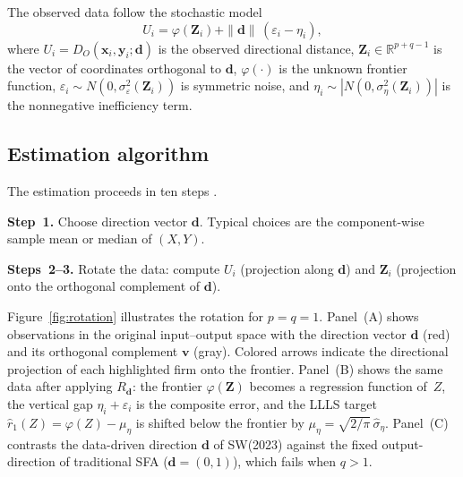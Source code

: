 \documentclass[article]{jss}
\begin{document}
The observed data follow the stochastic model
%
\begin{equation}
  U_i = \varphi(\mathbf{Z}_i) + \|\mathbf{d}\|\,(\varepsilon_i - \eta_i),
  \label{eq:model}
\end{equation}
%
where $U_i = D_O(\mathbf{x}_i,\mathbf{y}_i;\mathbf{d})$ is the observed
directional distance, $\mathbf{Z}_i \in \mathbb{R}^{p+q-1}$ is the
vector of coordinates orthogonal to $\mathbf{d}$, $\varphi(\cdot)$ is the
unknown frontier function, $\varepsilon_i \sim N(0,\sigma_\varepsilon^2(\mathbf{Z}_i))$
is symmetric noise, and $\eta_i \sim |N(0,\sigma_\eta^2(\mathbf{Z}_i))|$
is the nonnegative inefficiency term.

\subsection{Estimation algorithm}
\label{sec:algo}

The estimation proceeds in ten steps \citep{SimarWilson2023}.

\textbf{Step~1.} Choose direction vector $\mathbf{d}$.  Typical choices
are the component-wise sample mean or median of $(X,Y)$.

\textbf{Steps~2--3.} Rotate the data: compute $U_i$ (projection along
$\mathbf{d}$) and $\mathbf{Z}_i$ (projection onto the orthogonal
complement of $\mathbf{d}$).

Figure~\ref{fig:rotation} illustrates the rotation for $p = q = 1$.
Panel~(A) shows observations in the original input--output space
with the direction vector $\mathbf{d}$ (red) and its orthogonal
complement $\mathbf{v}$ (gray).  Colored arrows indicate the
directional projection of each highlighted firm onto the frontier.
Panel~(B) shows the same data after applying $R_{\mathbf{d}}$:
the frontier $\varphi(\mathbf{Z})$ becomes a regression function
of~$Z$, the vertical gap $\eta_i + \varepsilon_i$ is the composite
error, and the LLLS target $\hat{r}_1(Z) = \varphi(Z)-\mu_\eta$ is
shifted below the frontier by $\mu_\eta = \sqrt{2/\pi}\,\hat\sigma_\eta$.
Panel~(C) contrasts the data-driven direction $\mathbf{d}$ of
SW(2023) against the fixed output-direction of traditional SFA
($\mathbf{d}=(0,1)$), which fails when $q>1$.
\end{document}
